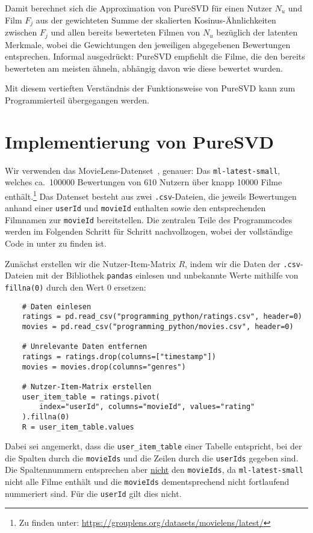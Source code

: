 Damit berechnet sich die Approximation von PureSVD für einen Nutzer \(N_{u}\) und Film \(F_{j}\) aus der gewichteten Summe der skalierten Kosinus-Ähnlichkeiten zwischen \(F_{j}\) und allen bereits bewerteten Filmen von \(N_{u}\) bezüglich der latenten Merkmale, wobei die Gewichtungen den jeweiligen abgegebenen Bewertungen entsprechen. 
Informal ausgedrückt:
PureSVD empfiehlt die Filme, die den bereits bewerteten am meisten ähneln, abhängig davon wie diese bewertet wurden.

Mit diesem vertieften Verständnis der Funktionsweise von PureSVD kann zum Programmierteil übergegangen werden.

\section{Implementierung von PureSVD}

Wir verwenden das MovieLens-Datenset~\cite{harperMovieLensDatasetsHistory2015}, genauer:
Das \texttt{ml-latest-small}, welches ca.\ \num{100000} Bewertungen von \num{610} Nutzern über knapp \num{10000} Filme enthält.\footnote{Zu finden unter: \url{https://grouplens.org/datasets/movielens/latest/}}
Das Datenset besteht aus zwei \texttt{.csv}-Dateien, die jeweils Bewertungen anhand einer \texttt{userId} und \texttt{movieId} enthalten sowie den entsprechenden Filmnamen zur \texttt{movieId} bereitstellen.
Die zentralen Teile des Programmcodes werden im Folgenden Schritt für Schritt nachvollzogen, wobei der vollständige Code in  unter  zu finden ist.

Zunächst erstellen wir die Nutzer-Item-Matrix \(R\), indem wir die Daten der \texttt{.csv}-Dateien mit der Bibliothek \texttt{pandas} einlesen und unbekannte Werte mithilfe von \texttt{fillna(0)} durch den Wert \num{0} ersetzen:  %
\begin{verbatim}
    # Daten einlesen
    ratings = pd.read_csv("programming_python/ratings.csv", header=0)
    movies = pd.read_csv("programming_python/movies.csv", header=0)

    # Unrelevante Daten entfernen
    ratings = ratings.drop(columns=["timestamp"])
    movies = movies.drop(columns="genres")

    # Nutzer-Item-Matrix erstellen
    user_item_table = ratings.pivot(
        index="userId", columns="movieId", values="rating"
    ).fillna(0)
    R = user_item_table.values
\end{verbatim}
Dabei sei angemerkt, dass die \texttt{user_item_table} einer Tabelle entspricht, bei der die Spalten durch die \texttt{movieIds} und die Zeilen durch die \texttt{userIds} gegeben sind.
Die Spaltennummern entsprechen aber \underline{nicht} den \texttt{movieIds}, da \texttt{ml-latest-small} nicht alle Filme enthält und die \texttt{movieIds} dementsprechend nicht fortlaufend nummeriert sind.
Für die \texttt{userId} gilt dies nicht.

